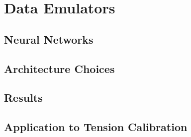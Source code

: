 \chapter{Data Emulators}
\section{Neural Networks}
\section{Architecture Choices}
\section{Results}
\section{Application to Tension Calibration}